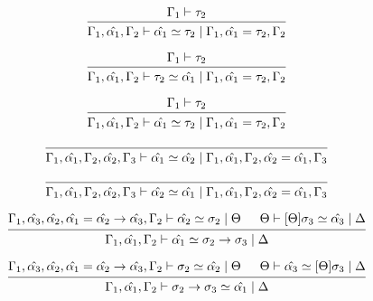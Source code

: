 \documentclass[12pt]{article}
\begin{document}
\[
    \begin{prooftree}
        \hypo{\Gamma_1 \vdash \tau_2}
        \infer1{\Gamma_1, \hat{\alpha_1}, \Gamma_2 \vdash \hat{\alpha_1} \simeq \tau_2 \mid \Gamma_1, \hat{\alpha_1} = \tau_2, \Gamma_2}
    \end{prooftree}
\]

\[
    \begin{prooftree}
        \hypo{\Gamma_1 \vdash \tau_2}
        \infer1{\Gamma_1, \hat{\alpha_1}, \Gamma_2 \vdash \tau_2 \simeq \hat{\alpha_1} \mid \Gamma_1, \hat{\alpha_1} = \tau_2, \Gamma_2}
    \end{prooftree}
\]

\[
    \begin{prooftree}
        \hypo{\Gamma_1 \vdash \tau_2}
        \infer1{\Gamma_1, \hat{\alpha_1}, \Gamma_2 \vdash \hat{\alpha_1} \simeq \tau_2 \mid \Gamma_1, \hat{\alpha_1} = \tau_2, \Gamma_2}
    \end{prooftree}
\]

\[
    \begin{prooftree}
        \infer0{\Gamma_1, \hat{\alpha_1}, \Gamma_2, \hat{\alpha_2}, \Gamma_3 \vdash \hat{\alpha_1} \simeq \hat{\alpha_2} \mid \Gamma_1, \hat{\alpha_1}, \Gamma_2, \hat{\alpha_2} = \hat{\alpha_1}, \Gamma_3}
    \end{prooftree}
\]

\[
    \begin{prooftree}
        \infer0{\Gamma_1, \hat{\alpha_1}, \Gamma_2, \hat{\alpha_2}, \Gamma_3 \vdash \hat{\alpha_2} \simeq \hat{\alpha_1} \mid \Gamma_1, \hat{\alpha_1}, \Gamma_2, \hat{\alpha_2} = \hat{\alpha_1}, \Gamma_3}
    \end{prooftree}
\]

\[
    \begin{prooftree}
        \hypo{\Gamma_1, \hat{\alpha_3}, \hat{\alpha_2}, \hat{\alpha_1} = \hat{\alpha_2} \to \hat{\alpha_3}, \Gamma_2 \vdash \hat{\alpha_2} \simeq \sigma_2 \mid \Theta}
        \hypo{\Theta \vdash [\Theta]\sigma_3 \simeq \hat{\alpha_3} \mid \Delta}
        \infer2{\Gamma_1, \hat{\alpha_1}, \Gamma_2 \vdash \hat{\alpha_1} \simeq \sigma_2 \to \sigma_3 \mid \Delta}
    \end{prooftree}
\]

\[
    \begin{prooftree}
        \hypo{\Gamma_1, \hat{\alpha_3}, \hat{\alpha_2}, \hat{\alpha_1} = \hat{\alpha_2} \to \hat{\alpha_3}, \Gamma_2 \vdash \sigma_2 \simeq \hat{\alpha_2} \mid \Theta}
        \hypo{\Theta \vdash \hat{\alpha_3} \simeq [\Theta]\sigma_3 \mid \Delta}
        \infer2{\Gamma_1, \hat{\alpha_1}, \Gamma_2 \vdash \sigma_2 \to \sigma_3 \simeq \hat{\alpha_1} \mid \Delta}
    \end{prooftree}
\]
\end{document}
